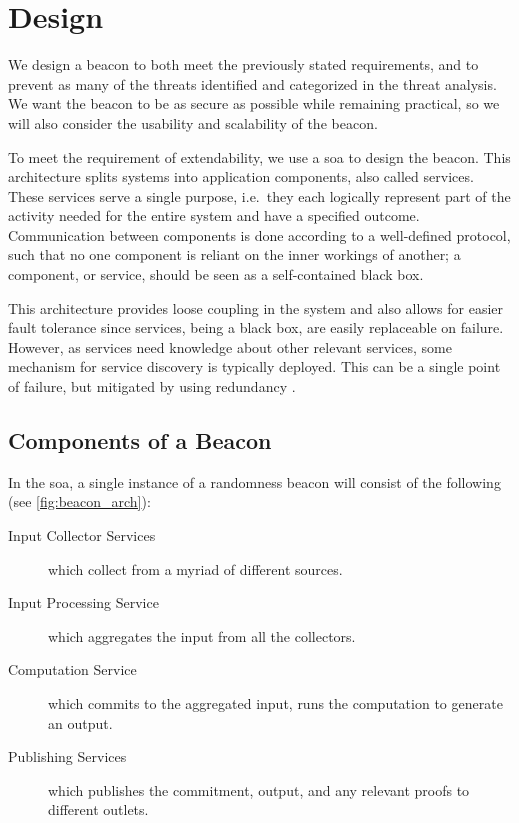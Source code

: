 \section{Design}\label{sec:design}


We design a beacon to both meet the previously stated requirements, and to prevent as many of the threats identified and categorized in the threat analysis. We want the beacon to be as secure as possible while remaining practical, so we will also consider the usability and scalability of the beacon.

To meet the requirement of extendability, we use a \gls{soa} to design the beacon.
This architecture splits systems into application components, also called services.
These services serve a single purpose, i.e.\ they each logically represent part of the activity needed for the entire system and have a specified outcome.
Communication between components is done according to a well-defined protocol, such that no one component is reliant on the inner workings of another;
a component, or service, should be seen as a self-contained black box.

This architecture provides loose coupling in the system and also allows for easier fault tolerance since services, being a black box, are easily replaceable on failure.
However, as services need knowledge about other relevant services, some mechanism for service discovery is typically deployed.
This can be a single point of failure, but mitigated by using redundancy \cite{soa_redundancy}.

\subsection{Components of a Beacon}
\label{sub:components_of_a_beacon}
In the \gls{soa}, a single instance of a randomness beacon will consist of the following (see \cref{fig:beacon_arch}):
\begin{description}
    \item[Input Collector Services] which collect from a myriad of different sources.
    \item[Input Processing Service] which aggregates the input from all the collectors.
    \item[Computation Service] which commits to the aggregated input, runs the computation to generate an output.
    \item[Publishing Services] which publishes the commitment, output, and any relevant proofs to different outlets.
\end{description}

